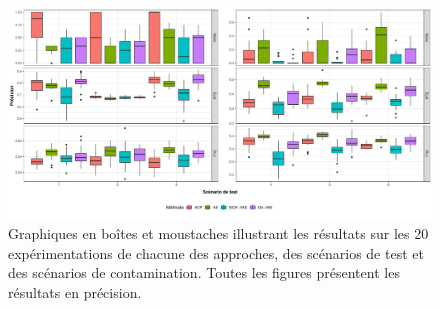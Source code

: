 \begin{figure}[H]
	\centering
	\includegraphics[width=\linewidth]{images/images_boxplots/precision_mnist.pdf}
	\caption{Graphiques en boîtes et moustaches illustrant les résultats sur les 20 expérimentations de chacune des approches, des scénarios de test et des scénarios de contamination. Toutes les figures présentent les résultats en précision.}
	\label{fig:precision_mnist}
\end{figure}

